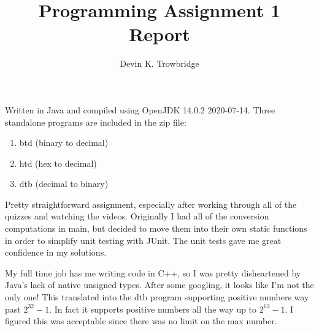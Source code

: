 \documentclass[a4paper,10pt]{article}
\title{Programming Assignment 1 Report}
\author{Devin K. Trowbridge}
\begin{document}
\maketitle
Written in Java and compiled using OpenJDK 14.0.2 2020-07-14. 
Three standalone programs are included in the zip file:
\begin{enumerate}
  \item btd (binary to decimal)
  \item htd (hex to decimal)
  \item dtb (decimal to binary)
\end{enumerate}

Pretty straightforward assignment, especially after working through all of the quizzes and watching the videos. Originally I had all of the conversion computations in main, but decided to move them into their own static functions in order to simplify unit testing with JUnit. The unit tests gave me great confidence in my solutions.

My full time job has me writing code in C++, so I was pretty disheartened by Java's lack of native unsigned types. After some googling, it looks like I'm not the only one! This translated into the dtb program supporting positive numbers way past $2^{32}-1$. In fact it supports positive numbers all the way up to $2^{63} - 1$. I figured this was acceptable since there was no limit on the max number.
\end{document}
